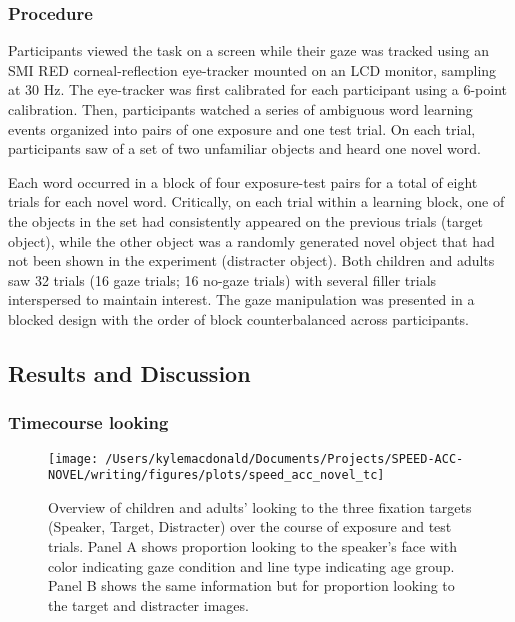 \documentclass[man,floatsintext]{apa6}
\begin{document}
\subsubsection{Procedure}\label{procedure-2}

Participants viewed the task on a screen while their gaze was tracked
using an SMI RED corneal-reflection eye-tracker mounted on an LCD
monitor, sampling at 30 Hz. The eye-tracker was first calibrated for
each participant using a 6-point calibration. Then, participants watched
a series of ambiguous word learning events organized into pairs of one
exposure and one test trial. On each trial, participants saw of a set of
two unfamiliar objects and heard one novel word.

Each word occurred in a block of four exposure-test pairs for a total of
eight trials for each novel word. Critically, on each trial within a
learning block, one of the objects in the set had consistently appeared
on the previous trials (target object), while the other object was a
randomly generated novel object that had not been shown in the
experiment (distracter object). Both children and adults saw 32 trials
(16 gaze trials; 16 no-gaze trials) with several filler trials
interspersed to maintain interest. The gaze manipulation was presented
in a blocked design with the order of block counterbalanced across
participants.

\subsection{Results and Discussion}\label{results-and-discussion-2}

\subsubsection{Timecourse looking}\label{timecourse-looking}

\begin{figure}[!t]

{\centering \texttt{[image: /Users/kylemacdonald/Documents/Projects/SPEED-ACC-NOVEL/writing/figures/plots/speed\_acc\_novel\_tc]} 

}

\caption{Overview of children and adults' looking to the three fixation targets (Speaker, Target, Distracter) over the course of exposure and test trials. Panel A shows proportion looking to the speaker's face with color indicating gaze condition and line type indicating age group. Panel B shows the same information but for proportion looking to the target and distracter images.}\label{fig:san-tc-plot}
\end{figure}
\end{document}
